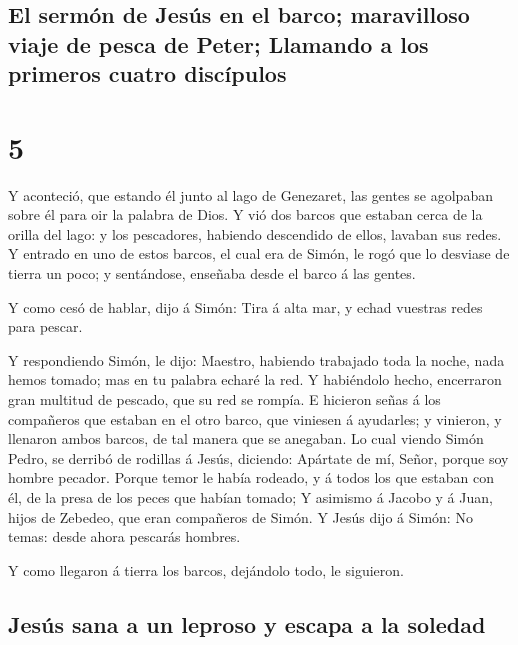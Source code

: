 \hypertarget{el-sermuxf3n-de-jesuxfas-en-el-barco-maravilloso-viaje-de-pesca-de-peter-llamando-a-los-primeros-cuatro-discuxedpulos}{%
\subsection{El sermón de Jesús en el barco; maravilloso viaje de pesca
de Peter; Llamando a los primeros cuatro
discípulos}\label{el-sermuxf3n-de-jesuxfas-en-el-barco-maravilloso-viaje-de-pesca-de-peter-llamando-a-los-primeros-cuatro-discuxedpulos}}

\hypertarget{section-4}{%
\section{5}\label{section-4}}

 Y aconteció, que estando él junto al lago de Genezaret,
las gentes se agolpaban sobre él para oir la palabra de Dios.
 Y vió dos barcos que estaban cerca de la orilla del lago:
y los pescadores, habiendo descendido de ellos, lavaban sus redes.
 Y entrado en uno de estos barcos, el cual era de Simón,
le rogó que lo desviase de tierra un poco; y sentándose, enseñaba desde
el barco á las gentes.

 Y como cesó de hablar, dijo á Simón: Tira á alta mar, y
echad vuestras redes para pescar.

 Y respondiendo Simón, le dijo: Maestro, habiendo
trabajado toda la noche, nada hemos tomado; mas en tu palabra echaré la
red.  Y habiéndolo hecho, encerraron gran multitud de
pescado, que su red se rompía.  E hicieron señas á los
compañeros que estaban en el otro barco, que viniesen á ayudarles; y
vinieron, y llenaron ambos barcos, de tal manera que se anegaban.
 Lo cual viendo Simón Pedro, se derribó de rodillas á
Jesús, diciendo: Apártate de mí, Señor, porque soy hombre pecador.
 Porque temor le había rodeado, y á todos los que estaban
con él, de la presa de los peces que habían tomado;  Y
asimismo á Jacobo y á Juan, hijos de Zebedeo, que eran compañeros de
Simón. Y Jesús dijo á Simón: No temas: desde ahora pescarás hombres.

 Y como llegaron á tierra los barcos, dejándolo todo, le
siguieron.

\hypertarget{jesuxfas-sana-a-un-leproso-y-escapa-a-la-soledad}{%
\subsection{Jesús sana a un leproso y escapa a la
soledad}\label{jesuxfas-sana-a-un-leproso-y-escapa-a-la-soledad}}

